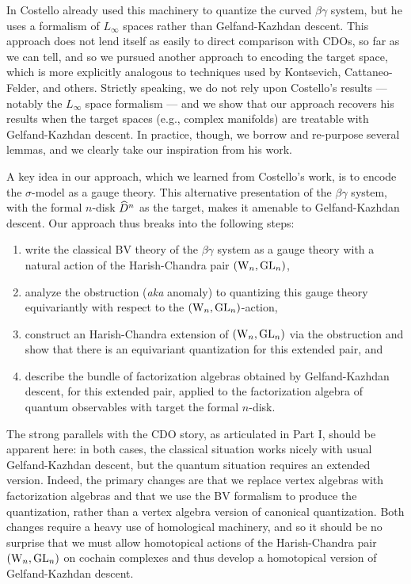 \begin{rmk}
In \cite{WG1,WG2} Costello already used this machinery to quantize the curved $\beta\gamma$ system,
but he uses a formalism of $L_\infty$ spaces rather than Gelfand-Kazhdan descent.
This approach does not lend itself as easily to direct comparison with CDOs, so far as we can tell,
and so we pursued another approach to encoding the target space, 
which is more explicitly analogous to techniques used by Kontsevich, Cattaneo-Felder, and others.
Strictly speaking, we do not rely upon Costello's results --- notably the $L_\infty$ space formalism --- and we show that our approach recovers his results when the target spaces (e.g., complex manifolds) 
are treatable with Gelfand-Kazhdan descent.
In practice, though, we borrow and re-purpose several lemmas, and 
we clearly take our inspiration from his work.
\end{rmk}

A key idea in our approach, which we learned from Costello's work, is to encode the $\sigma$-model as a gauge theory. 
This alternative presentation of the $\beta\gamma$ system, with the formal $n$-disk $\widehat{D}^n$ as the target,
makes it amenable to Gelfand-Kazhdan descent.
Our approach thus breaks into the following steps:
\begin{enumerate}
\item write the classical BV theory of the $\beta\gamma$ system as a gauge theory with a natural action of the Harish-Chandra pair $({{\rm W}_n},{\rm GL}_n)$,
\item analyze the obstruction ({\em aka} anomaly) to quantizing this gauge theory equivariantly with respect to the $({{\rm W}_n},{\rm GL}_n)$-action,
\item construct an Harish-Chandra extension of $({{\rm W}_n},{\rm GL}_n)$ via the obstruction and show that there is an equivariant quantization for this extended pair, and
\item describe the bundle of factorization algebras obtained by
  Gelfand-Kazhdan descent, for this extended pair, applied to the
  factorization algebra of quantum observables with target the formal $n$-disk.
\end{enumerate}
The strong parallels with the CDO story, as articulated in Part I, should be apparent here: 
in both cases, the classical situation works nicely with usual Gelfand-Kazhdan descent, but the quantum situation requires an extended version.
Indeed, the primary changes are that we replace vertex algebras with factorization algebras and that we use the BV formalism to produce the quantization, rather than a vertex algebra version of canonical quantization.
Both changes require a heavy use of homological machinery, and so it should be no surprise that we must allow homotopical actions of the Harish-Chandra pair $({{\rm W}_n},{\rm GL}_n)$ on cochain complexes and thus develop a homotopical version of Gelfand-Kazhdan descent.

